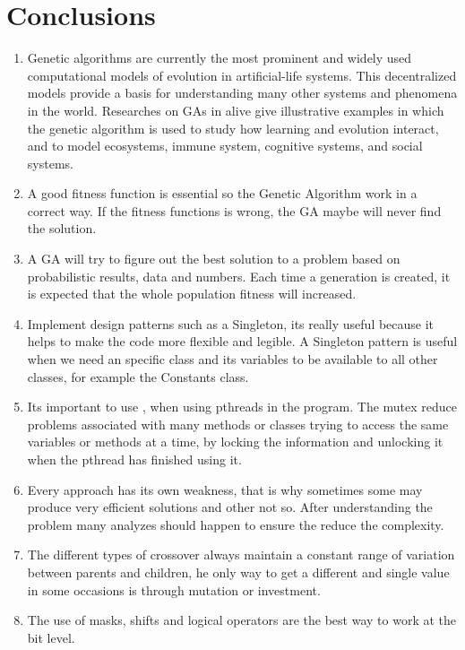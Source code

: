 \documentclass[twocolumn]{IEEEtran}
\begin{document}
\section{Conclusions}
\begin{enumerate}
    \item Genetic algorithms are currently the most prominent and widely used computational models of evolution in artificial-life systems. This decentralized models provide a basis for understanding many other systems and phenomena in the world. Researches on GAs in alive give illustrative examples in which the genetic algorithm is used to study how learning and evolution interact, and to model ecosystems, immune system, cognitive systems, and social systems.
    \item A good fitness function is essential so the Genetic Algorithm work in a correct way. If the fitness functions is wrong, the GA maybe will never find the solution.
    \item A GA will try to figure out the best solution to a problem based on probabilistic results, data and numbers. Each time a generation is created, it is expected that the whole population fitness will increased.
    \item Implement design patterns such as a Singleton, its really useful because it helps to make the code more flexible and legible. A Singleton pattern is useful when we need an specific class and its variables to be available to all other classes, for example the Constants class.
    \item Its important to use , when using pthreads in the program. The mutex reduce problems associated with many methods or classes trying to access the same variables or methods at a time, by locking the information and unlocking it when the pthread has finished using it.
    \item Every approach has its own weakness, that is why sometimes some may produce very efficient solutions and other not so. After understanding the problem many analyzes should happen to ensure the reduce the complexity.\cite{22} 
    \item The different types of crossover always maintain a constant range of variation between parents and children, he only way to get a different and single value in some occasions is through mutation or investment.
    \item The use of masks, shifts and logical operators are the best way to work at the bit level.
\end{enumerate}
\end{document}
